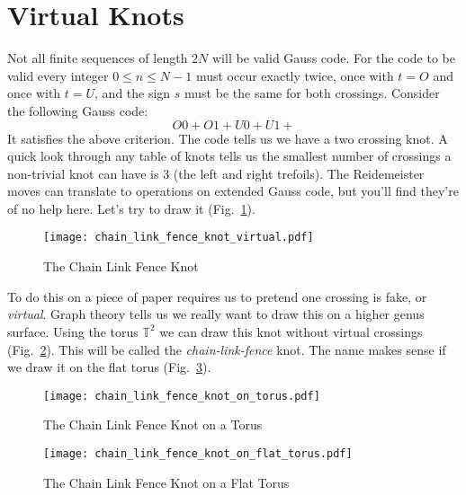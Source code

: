 \documentclass{article}
\theoremstyle{plain}
\begin{document}
    \section{Virtual Knots}
        Not all finite sequences of length $2N$ will be valid Gauss code. For
        the code to be valid every integer $0\leq{n}\leq{N-1}$ must occur
        exactly twice, once with $t=O$ and once with $t=U$, and the sign
        $s$ must be the same for both crossings. Consider the following Gauss
        code:
        \begin{equation}
            O0+O1+U0+U1+
        \end{equation}
        It satisfies the above criterion.
        The code tells us we have a two crossing knot. A quick look through any
        table of knots tells us the smallest number of crossings a non-trivial
        knot can have is 3 (the left and right trefoils). The
        Reidemeister moves can translate to operations on extended Gauss code,
        but you'll find they're of no help here. Let's try to draw it
        (Fig.~\ref{fig:chain_link_fence_knot}).
        \begin{figure}
            \centering
            \texttt{[image: chain\_link\_fence\_knot\_virtual.pdf]}
            \caption{The Chain Link Fence Knot}
            \label{fig:chain_link_fence_knot}
        \end{figure}
        To do this on a piece of paper requires us to pretend one crossing is
        fake, or \textit{virtual}. Graph theory tells us we really want to draw
        this on a higher genus surface. Using the torus $\mathbb{T}^{2}$ we can
        draw this knot without virtual crossings
        (Fig.~\ref{fig:chain_link_fence_knot_on_torus}). This will be called
        the \textit{chain-link-fence} knot. The name makes sense if we draw it
        on the flat torus (Fig.~\ref{fig:chain_link_fence_knot_on_flat_torus}).
        \begin{figure}
            \centering
            \texttt{[image: chain\_link\_fence\_knot\_on\_torus.pdf]}
            \caption{The Chain Link Fence Knot on a Torus}
            \label{fig:chain_link_fence_knot_on_torus}
        \end{figure}
        \begin{figure}
            \centering
            \texttt{[image: chain\_link\_fence\_knot\_on\_flat\_torus.pdf]}
            \caption{The Chain Link Fence Knot on a Flat Torus}
            \label{fig:chain_link_fence_knot_on_flat_torus}
        \end{figure}
\end{document}
